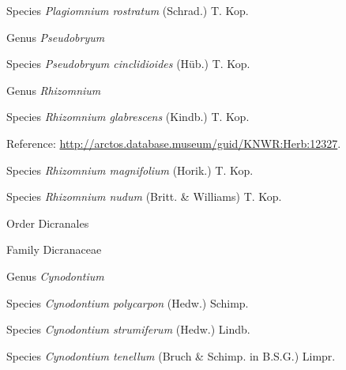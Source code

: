\documentclass[9pt, article]{memoir}
\begin{document}
\begin{multicols}{2}
\vspace{6pt}\noindent\hspace{36pt}Species \textit{Plagiomnium rostratum} (Schrad.) T. Kop.


\vspace{6pt}\noindent\hspace{30pt}Genus \textit{Pseudobryum}


\vspace{6pt}\noindent\hspace{36pt}Species \textit{Pseudobryum cinclidioides} (Hüb.) T. Kop.


\vspace{6pt}\noindent\hspace{30pt}Genus \textit{Rhizomnium}


\vspace{6pt}\noindent\hspace{36pt}Species \textit{Rhizomnium glabrescens} (Kindb.) T. Kop.


\vspace{6pt}Reference: 
\url{http://arctos.database.museum/guid/KNWR:Herb:12327}.

\vspace{6pt}\noindent\hspace{36pt}Species \textit{Rhizomnium magnifolium} (Horik.) T. Kop.


\vspace{6pt}\noindent\hspace{36pt}Species \textit{Rhizomnium nudum} (Britt. \& Williams) T. Kop.


\vspace{6pt}\noindent\hspace{18pt}Order Dicranales


\vspace{6pt}\noindent\hspace{24pt}Family Dicranaceae


\vspace{6pt}\noindent\hspace{30pt}Genus \textit{Cynodontium}


\vspace{6pt}\noindent\hspace{36pt}Species \textit{Cynodontium polycarpon} (Hedw.) Schimp.


\vspace{6pt}\noindent\hspace{36pt}Species \textit{Cynodontium strumiferum} (Hedw.) Lindb.


\vspace{6pt}\noindent\hspace{36pt}Species \textit{Cynodontium tenellum} (Bruch \& Schimp. in B.S.G.) Limpr.



\end{multicols}
\end{document}
